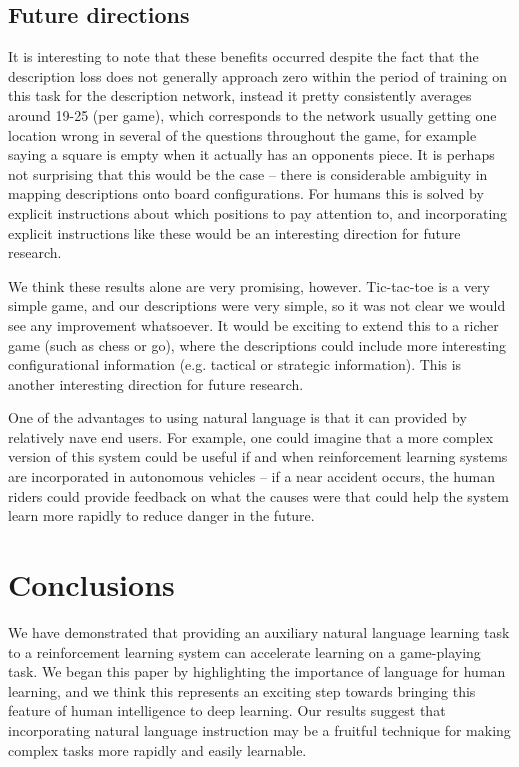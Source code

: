 \documentclass{article} %
\begin{document}
\subsection{Future directions}
It is interesting to note that these benefits occurred despite the fact that the description loss does not generally approach zero within the period of training on this task for the description network, instead it pretty consistently averages around 19-25 (per game), which corresponds to the network usually getting one location wrong in several of the questions throughout the game, for example saying a square is empty when it actually has an opponents piece. It is perhaps not surprising that this would be the case -- there is considerable ambiguity in mapping descriptions onto board configurations. For humans this is solved by explicit instructions about which positions to pay attention to, and incorporating explicit instructions like these would be an interesting direction for future research. \par
We think these results alone are very promising, however. Tic-tac-toe is a very simple game, and our descriptions were very simple, so it was not clear we would see any improvement whatsoever. It would be exciting to extend this to a richer game (such as chess or go), where the descriptions could include more interesting configurational information (e.g. tactical or strategic information). This is another interesting direction for future research. \par
One of the advantages to using natural language is that it can provided by relatively nave end users. For example, one could imagine that a more complex version of this system could be useful if and when reinforcement learning systems are incorporated in autonomous vehicles -- if a near accident occurs, the human riders could provide feedback on what the causes were that could help the system learn more rapidly to reduce danger in the future. \par
\section{Conclusions}
We have demonstrated that providing an auxiliary natural language learning task to a reinforcement learning system can accelerate learning on a game-playing task. We began this paper by highlighting the importance of language for human learning, and we think this represents an exciting step towards bringing this feature of human intelligence to deep learning. Our results suggest that incorporating natural language instruction may be a fruitful technique for making complex tasks more rapidly and easily learnable.  




\end{document}
